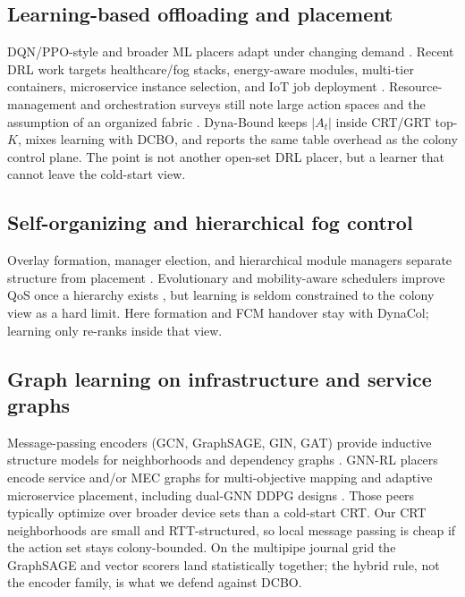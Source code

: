 \documentclass[11pt,a4paper]{article}
\begin{document}
\subsection{Learning-based offloading and placement}
DQN/PPO-style and broader ML placers adapt under changing demand
\cite{mnih_nature2015_dqn,schulman_ppo2017,supraja_cluster2025_slr,haddadha_aire2024_mlplacement,abdulazeez_access2023_offload}.
Recent DRL work targets healthcare/fog stacks, energy-aware modules, multi-tier
containers, microservice instance selection, and IoT job deployment
\cite{tuli_iotj2020_dynamic,hossam_cluster2024_energy,dogani_cluster2024_twotier,boudieb_fgcs2024_drl,bushehrian_computing2025_drl}.
Resource-management and orchestration surveys still note large action spaces and
the assumption of an organized fabric
\cite{hong_csur2019_resource,costa_csur2022,pallewatta_csur2023_microservices,mahmud_csur2020_appmgmt}.
Dyna-Bound keeps $|A_t|$ inside CRT/GRT top-$K$, mixes learning with DCBO, and
reports the same table overhead as the colony control plane. The point is not
another open-set DRL placer, but a learner that cannot leave the cold-start
view.

\subsection{Self-organizing and hierarchical fog control}
Overlay formation, manager election, and hierarchical module managers separate
structure from placement
\cite{mahmud_fog_application2018,bittencourt_cloudcomp2017_mobility,ouyang_jiot2021_drloffload}.
Evolutionary and mobility-aware schedulers improve QoS once a hierarchy exists
\cite{guerrero_fgcs2019_evolutionary}, but learning is seldom constrained to the
colony view as a hard limit. Here formation and FCM handover stay with DynaCol;
learning only re-ranks inside that view.

\subsection{Graph learning on infrastructure and service graphs}
Message-passing encoders (GCN, GraphSAGE, GIN, GAT) provide inductive structure
models for neighborhoods and dependency graphs
\cite{kipf_gcn_iclr2017,hamilton_graphsage2017,xu_gin_iclr2019,velickovic_gat2018}.
GNN-RL placers encode service and/or MEC graphs for multi-objective mapping and
adaptive microservice placement, including dual-GNN DDPG designs
\cite{lera_jsup2024_gnn,chen_tmc2024_dgddpg}.
Those peers typically optimize over broader device sets than a cold-start CRT.
Our CRT neighborhoods are small and RTT-structured, so local message passing is
cheap if the action set stays colony-bounded. On the multipipe journal grid the
GraphSAGE and vector scorers land statistically together; the hybrid rule, not
the encoder family, is what we defend against DCBO.
\end{document}
